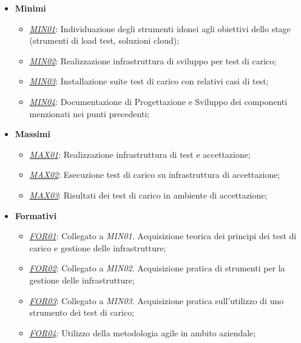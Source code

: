 \begin{itemize}
	\item \textbf{Minimi}
	\begin{itemize}
		\item \underline{\textit{MIN01}}: Individuazione degli strumenti idonei agli obiettivi dello stage (strumenti di load test, soluzioni cloud);
		\item \underline{\textit{MIN02}}: Realizzazione infrastruttura di sviluppo per test di carico;
		\item \underline{\textit{MIN03}}: Installazione suite test di carico con relativi casi di test;
		\item \underline{\textit{MIN04}}: Documentazione di Progettazione e Sviluppo dei componenti menzionati nei punti precedenti;
	\end{itemize}
	\item \textbf{Massimi}
	\begin{itemize}
		\item \underline{\textit{MAX01}}: Realizzazione infrastruttura di test e accettazione;
		\item \underline{\textit{MAX02}}: Esecuzione test di carico su infrastruttura di accettazione;
		\item \underline{\textit{MAX03}}: Risultati dei test di carico in ambiente di accettazione; 
	\end{itemize}
	\item \textbf{Formativi}
	\begin{itemize}
		\item \underline{\textit{FOR01}}: Collegato a \textit{MIN01}. Acquisizione teorica dei principi dei test di carico e gestione delle infrastrutture;
		\item \underline{\textit{FOR02}}: Collegato a \textit{MIN02}. Acquisizione pratica di strumenti per la gestione delle infrastrutture;
		\item \underline{\textit{FOR03}}: Collegato a \textit{MIN03}. Acquisizione pratica sull'utilizzo di uno strumento dei test di carico;
		\item \underline{\textit{FOR04}}: Utilizzo della metodologia agile in ambito aziendale;		
	\end{itemize}
\end{itemize}
